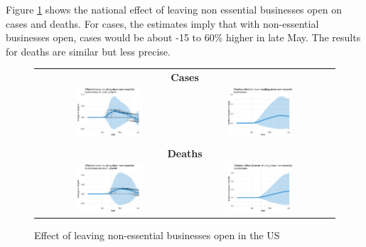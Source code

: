 \documentclass[11pt,reqno,letter]{amsart}
\theoremstyle{definition}
\begin{document}
Figure \ref{fig:US-nb} shows the national effect of leaving non
essential businesses open on cases and deaths. For cases, the
estimates imply that with non-essential businesses open, cases would
be about -15 to 60\% higher in late May. The results for deaths are
similar but less precise.

\begin{figure}[ht]
  \caption{Effect of leaving non-essential businesses open in the US\label{fig:US-nb}}
  \begin{minipage}{\linewidth}
    \centering
    \begin{tabular}{cc}
      \multicolumn{2}{c}{\textbf{Cases}} \\
      \includegraphics[width=0.45\textwidth]{tables_and_figures/us-nb-dgrowth_v1}
      &
        \includegraphics[width=0.45\textwidth]{tables_and_figures/us-nb-rel_v1}
      \\
      \\
      \multicolumn{2}{c}{\textbf{Deaths}} \\
      \includegraphics[width=0.45\textwidth]{tables_and_figures/us-nb-dgrowth_deaths_v1}
      &
        \includegraphics[width=0.45\textwidth]{tables_and_figures/us-nb-rel_deaths_v1}
    \end{tabular}
  \end{minipage}
\end{figure}
\end{document}
